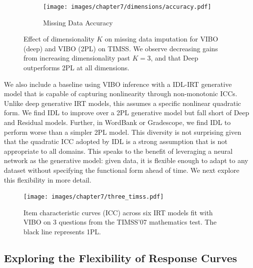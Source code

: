 \begin{figure}
    \centering
    \begin{subfigure}[b]{0.7\textwidth}
        \centering
        \texttt{[image: images/chapter7/dimensions/accuracy.pdf]}
        \caption{Missing Data Accuracy}
    \end{subfigure}
    \caption{Effect of dimensionality $K$ on missing data imputation for VIBO (deep) and VIBO (2PL) on TIMSS. We observe decreasing gains from increasing dimensionality past $K=3$, and that  Deep outperforms 2PL at all dimensions.}
    \label{fig:dimensionality}
\end{figure}

We also include a baseline using VIBO inference with a IDL-IRT generative model that is capable of capturing nonlinearity through non-monotonic ICCs. 
Unlike deep generative IRT models, this assumes a specific nonlinear quadratic form. 
We find IDL to improve over a 2PL generative model but fall short of Deep and Residual models. 
Further, in WordBank or Gradescope, we find IDL to perform worse than a simpler 2PL model. 
This diversity is not surprising given that the quadratic ICC adopted by IDL is a strong assumption that is not appropriate to all domains.
This speaks to the benefit of leveraging a neural network as the generative model: given data, it is flexible enough to adapt to any dataset without specifying the functional form ahead of time.
We next explore this flexibility in more detail.

\begin{figure}
    \centering
    \texttt{[image: images/chapter7/three\_timss.pdf]}
    \caption{Item characteristic curves (ICC) across six IRT models fit with VIBO on 3 questions from the TIMSS'07 mathematics test. The black line represents 1PL.}
    \label{fig:icc:timss}
\end{figure}

\subsection{Exploring the Flexibility of Response Curves} 

